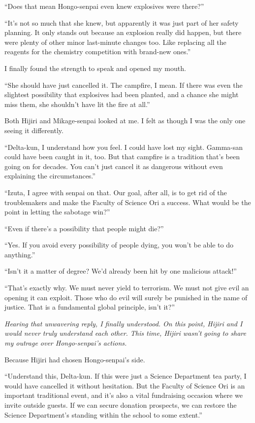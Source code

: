 \documentclass[
    a4paper,
    12pt,
    twoside,
    openany,
    UTF8,
    fontset=windows
]{ctexbook}
\begin{document}
``Does that mean Hongo-senpai even knew explosives were there?''

``It's not so much that she knew, but apparently it was just part of her safety planning. It only stands out because an explosion really did happen, but there were plenty of other minor last-minute changes too. Like replacing all the reagents for the chemistry competition with brand-new ones.''

I finally found the strength to speak and opened my mouth.

``She should have just cancelled it. The campfire, I mean. If there was even the slightest possibility that explosives had been planted, and a chance she might miss them, she shouldn't have lit the fire at all.''

Both Hijiri and Mikage-senpai looked at me. I felt as though I was the only one seeing it differently.

``Delta-kun, I understand how you feel. I could have lost my sight. Gamma-san could have been caught in it, too. But that campfire is a tradition that's been going on for decades. You can't just cancel it as dangerous without even explaining the circumstances.''

``Izuta, I agree with senpai on that. Our goal, after all, is to get rid of the troublemakers and make the Faculty of Science Ori a success. What would be the point in letting the sabotage win?''

``Even if there's a possibility that people might die?''

``Yes. If you avoid every possibility of people dying, you won't be able to do anything.''

``Isn't it a matter of degree? We'd already been hit by one malicious attack!''

``That's exactly why. We must never yield to terrorism. We must not give evil an opening it can exploit. Those who do evil will surely be punished in the name of justice. That is a fundamental global principle, isn't it?''

\textit{Hearing that unwavering reply, I finally understood. On this point, Hijiri and I would never truly understand each other. This time, Hijiri wasn't going to share my outrage over Hongo-senpai's actions.}

Because Hijiri had chosen Hongo-senpai's side.

``Understand this, Delta-kun. If this were just a Science Department tea party, I would have cancelled it without hesitation. But the Faculty of Science Ori is an important traditional event, and it's also a vital fundraising occasion where we invite outside guests. If we can secure donation prospects, we can restore the Science Department's standing within the school to some extent.''
\end{document}
